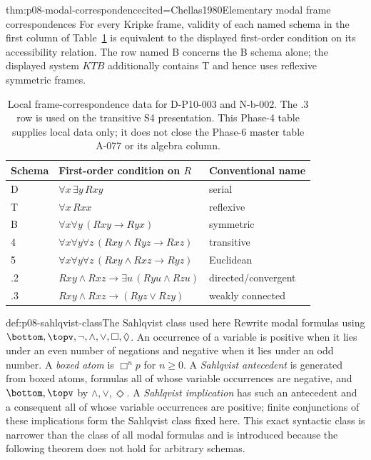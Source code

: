 \begin{hbtheorem}{thm:p08-modal-correspondence}{cited=Chellas1980}{Elementary modal frame correspondences}
For every Kripke frame, validity of each named schema in the first column of
Table~\ref{tab:p08-modal-correspondence} is equivalent to the displayed
first-order condition on its accessibility relation.  The row named B concerns
the B schema alone; the displayed system \(KTB\) additionally contains T and
hence uses reflexive symmetric frames.
\end{hbtheorem}

\begin{table}[!htbp]
\centering
\small
\begin{tabular}{@{}lll@{}}
\toprule
Schema & First-order condition on \(R\) & Conventional name \\
\midrule
D & \(\forall x\,\exists y\,Rxy\) & serial \\
T & \(\forall x\,Rxx\) & reflexive \\
B & \(\forall x\forall y\,(Rxy\to Ryx)\) & symmetric \\
4 & \(\forall x\forall y\forall z\,(Rxy\land Ryz\to Rxz)\) & transitive \\
5 & \(\forall x\forall y\forall z\,(Rxy\land Rxz\to Ryz)\) & Euclidean \\
.2 & \(Rxy\land Rxz\to\exists u\,(Ryu\land Rzu)\) & directed/convergent \\
.3 & \(Rxy\land Rxz\to(Ryz\lor Rzy)\) & weakly connected \\
\bottomrule
\end{tabular}
\caption{Local frame-correspondence data for D-P10-003 and N-b-002.  The .3
row is used on the transitive S4 presentation.  This Phase-4 table supplies
local data only; it does not close the Phase-6 master table A-077 or its
algebra column.}
\label{tab:p08-modal-correspondence}
\end{table}

\begin{hbdefinition}{def:p08-sahlqvist-class}{The Sahlqvist class used here}
Rewrite modal formulas using \(\bottom,\topv,\neg,\land,\lor,\Box,\Diamond\).
An occurrence of a variable is positive when it lies under an even number of
negations and negative when it lies under an odd number.  A \emph{boxed atom}
is \(\Box^n p\) for \(n\geq0\).  A \emph{Sahlqvist antecedent} is generated
from boxed atoms, formulas all of whose variable occurrences are negative,
and \(\bottom,\topv\) by \(\land,\lor,\Diamond\).  A \emph{Sahlqvist
implication} has such an antecedent and a consequent all of whose variable
occurrences are positive; finite conjunctions of these implications form the
Sahlqvist class fixed here.  This exact syntactic class is narrower than the
class of all modal formulas and is introduced because the following theorem
does not hold for arbitrary schemas.
\end{hbdefinition}

